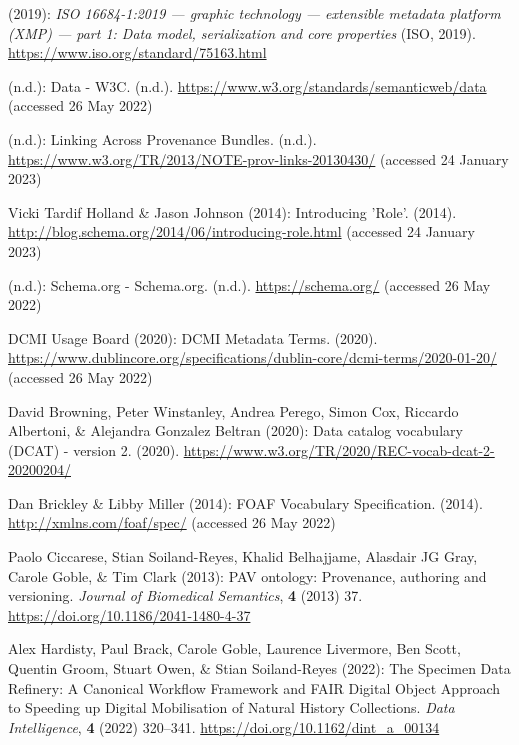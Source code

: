 \begin{thebibliography}{9}
(2019): \emph{{ISO} 16684-1:2019 --- graphic technology --- extensible
metadata platform (XMP) --- part 1: Data model, serialization and core
properties} ({ISO}, 2019). \url{https://www.iso.org/standard/75163.html}

(n.d.): Data - {W3C}. (n.d.).
\url{https://www.w3.org/standards/semanticweb/data} (accessed 26 May
2022)

(n.d.): Linking {Across Provenance Bundles}. (n.d.).
\url{https://www.w3.org/TR/2013/NOTE-prov-links-20130430/} (accessed 24
January 2023)

Vicki Tardif Holland \& Jason Johnson (2014): Introducing '{Role}'.
(2014). \url{http://blog.schema.org/2014/06/introducing-role.html}
(accessed 24 January 2023)

(n.d.): Schema.org - {Schema}.org. (n.d.). \url{https://schema.org/}
(accessed 26 May 2022)

DCMI Usage Board (2020): {DCMI Metadata Terms}. (2020).
\url{https://www.dublincore.org/specifications/dublin-core/dcmi-terms/2020-01-20/}
(accessed 26 May 2022)

David Browning, Peter Winstanley, Andrea Perego, Simon Cox, Riccardo
Albertoni, \& Alejandra Gonzalez Beltran (2020): Data catalog vocabulary
({DCAT}) - version 2. (2020).
\url{https://www.w3.org/TR/2020/REC-vocab-dcat-2-20200204/}

Dan Brickley \& Libby Miller (2014): {FOAF Vocabulary Specification}.
(2014). \url{http://xmlns.com/foaf/spec/} (accessed 26 May 2022)

Paolo Ciccarese, Stian Soiland-Reyes, Khalid Belhajjame, Alasdair JG
Gray, Carole Goble, \& Tim Clark (2013): {PAV} ontology: Provenance,
authoring and versioning. \emph{Journal of Biomedical Semantics},
\textbf{4} (2013) 37.
\url{https://doi.org/10.1186/2041-1480-4-37}

Alex Hardisty, Paul Brack, Carole Goble, Laurence Livermore, Ben Scott,
Quentin Groom, Stuart Owen, \& Stian Soiland-Reyes (2022): The {Specimen
Data Refinery}: {A Canonical Workflow Framework} and {FAIR} {Digital
Object Approach} to {Speeding} up {Digital Mobilisation} of {Natural
History} {Collections}. \emph{Data Intelligence}, \textbf{4} (2022)
320--341.
\url{https://doi.org/10.1162/dint_a_00134}


\end{thebibliography}

